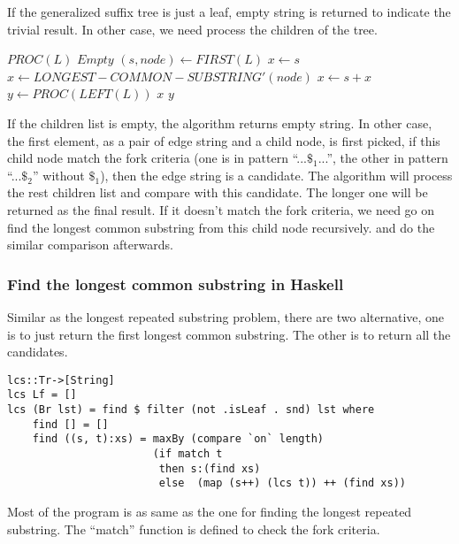 \documentclass{article}
\begin{document}
If the generalized suffix tree is just a leaf, empty string is
returned to indicate the trivial result. In other case, we
need process the children of the tree.

\begin{algorithmic}
\STATE $PROC(L)$
    \RETURN $Empty$
  \ELSE
    \STATE $(s, node) \leftarrow FIRST(L)$
      \STATE $x \leftarrow s$
    \ELSE
      \STATE $x \leftarrow LONGEST-COMMON-SUBSTRING'(node)$
        \STATE $x \leftarrow s + x$
      \ENDIF
    \ENDIF
    \STATE $y \leftarrow PROC(LEFT(L))$
      \RETURN $x$
    \ELSE
      \RETURN $y$
    \ENDIF
  \ENDIF
\end{algorithmic}

If the children list is empty, the algorithm returns empty 
string. In other case, the first element, as a pair of edge
string and a child node, is first picked, if this child node
match the fork criteria (one is in pattern ``...$\$_1$...'',
the other in pattern ``...$\$_2$'' without $\$_1$), then the edge string is
a candidate. The algorithm will process the rest children 
list and compare with this candidate. The longer one will 
be returned as the final result.
If it doesn't match the fork criteria, we need go on find the
longest common substring from this child node recursively.
and do the similar comparison afterwards.

\subsubsection*{Find the longest common substring in Haskell}
Similar as the longest repeated substring problem, there
are two alternative, one is to just return the first longest
common substring. The other is to return all the candidates.

\lstset{language=Haskell}
\begin{lstlisting}
lcs::Tr->[String]
lcs Lf = []
lcs (Br lst) = find $ filter (not .isLeaf . snd) lst where
    find [] = []
    find ((s, t):xs) = maxBy (compare `on` length) 
                       (if match t 
                        then s:(find xs)
                        else  (map (s++) (lcs t)) ++ (find xs))
\end{lstlisting} %

Most of the program is as same as the one for finding the longest
repeated substring. The ``match'' function is defined to check
the fork criteria.
\end{document}
